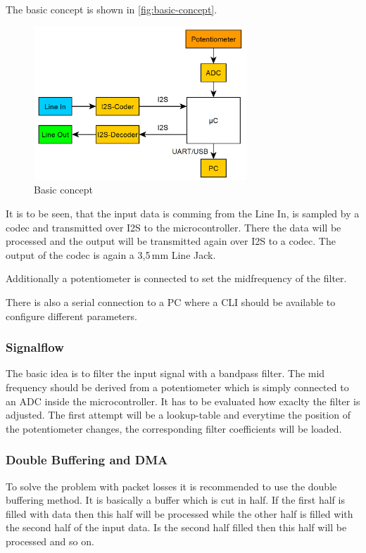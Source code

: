 The basic concept is shown in \autoref{fig:basic-concept}.

\begin{figure}[!h]
    \centering
    \includegraphics[width=8cm]{img/basic_concept.PNG}
    \caption{Basic concept}
    \label{fig:basic-concept}
\end{figure}

It is to be seen, that the input data is comming from the Line In, is sampled by a codec and transmitted
over \ac{I2S} to the microcontroller. There the data will be processed and the output will be transmitted
again over \ac{I2S} to a codec. The output of the codec is again a 3,5\,mm Line Jack.

Additionally a potentiometer is connected to set the midfrequency of the filter.

There is also a serial connection to a PC where a \ac{CLI} should be available to configure
different parameters.

\subsubsection{Signalflow}

The basic idea is to filter the input signal with a bandpass filter. The mid frequency should be derived
from a potentiometer which is simply connected to an \ac{ADC} inside the microcontroller. It has to be evaluated
how exaclty the filter is adjusted. The first attempt will be a lookup-table and everytime the position of the
potentiometer changes, the corresponding filter coefficients will be loaded.

\subsubsection{Double Buffering and DMA}

To solve the problem with packet losses it is recommended to use the double buffering method.
It is basically a buffer which is cut in half. If the first half is filled with data then this half
will be processed while the other half is filled with the second half of the input data. Is the second
half filled then this half will be processed and so on.

